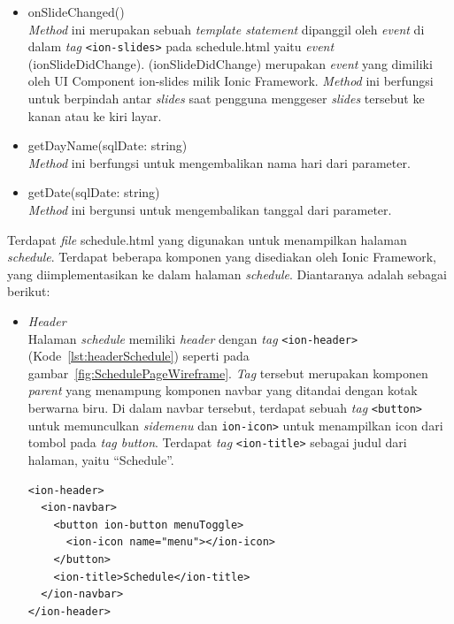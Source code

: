 \begin{enumerate}
\begin{enumerate}
\begin{itemize}
		\item onSlideChanged() \\
		\textit{Method} ini merupakan sebuah \textit{template statement} dipanggil oleh \textit{event} di dalam \textit{tag} \texttt{<ion-slides>} pada schedule.html yaitu \textit{event} (ionSlideDidChange). (ionSlideDidChange) merupakan \textit{event} yang dimiliki oleh UI Component ion-slides milik Ionic Framework. \textit{Method} ini berfungsi untuk berpindah antar \textit{slides} saat pengguna menggeser \textit{slides} tersebut ke kanan atau ke kiri layar.
		\item getDayName(sqlDate: string) \\
		\textit{Method} ini berfungsi untuk mengembalikan nama hari dari parameter.
		\item getDate(sqlDate: string) \\
		\textit{Method} ini bergunsi untuk mengembalikan tanggal dari parameter.
	\end{itemize}
	
	Terdapat \textit{file} schedule.html yang digunakan untuk menampilkan halaman \textit{schedule}. Terdapat beberapa komponen yang disediakan oleh Ionic Framework, yang diimplementasikan ke dalam halaman \textit{schedule}. Diantaranya adalah sebagai berikut:
	
	\begin{itemize}
		\item \textit{Header} \\
		Halaman \textit{schedule} memiliki \textit{header} dengan \textit{tag} \texttt{<ion-header>} (Kode~\ref{lst:headerSchedule}) seperti pada gambar~\ref{fig:SchedulePageWireframe}. \textit{Tag} tersebut merupakan komponen \textit{parent} yang menampung komponen navbar yang ditandai dengan kotak berwarna biru. Di dalam navbar tersebut, terdapat sebuah \textit{tag} \texttt{<button>} untuk memunculkan \textit{sidemenu} dan \texttt{ion-icon>} untuk menampilkan icon dari tombol pada \textit{tag button}. Terdapat \textit{tag} \texttt{<ion-title>} sebagai judul dari halaman, yaitu ``Schedule''.
		
\begin{lstlisting}[label={lst:headerSchedule}, caption=\textit{Header} pada schedule.html]
<ion-header>
  <ion-navbar>
    <button ion-button menuToggle>
      <ion-icon name="menu"></ion-icon>
    </button>
    <ion-title>Schedule</ion-title>
  </ion-navbar>
</ion-header>
\end{lstlisting} 


\end{itemize}
\end{enumerate}
\end{enumerate}

